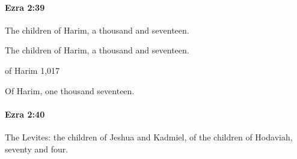 		\paragraph{Ezra 2:39} %
			\label{EZRA-2-39}

			The children of Harim, a thousand and seventeen.

			\begin{versebox}
					\item[BHS] 
					\item[ASV] The children of Harim, a thousand and seventeen.
					\item[NIV] of Harim 1,017
					\item[NRSV] Of Harim, one thousand seventeen.
			\end{versebox}

		\paragraph{Ezra 2:40} %
			\label{EZRA-2-40}

			The Levites: the children of Jeshua and Kadmiel, of the children of Hodaviah, seventy and four.

